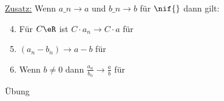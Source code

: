 \ul{Zusatz:} Wenn $a\_n→a$ und $b\_n→b$ für $\nif{}$ dann gilt:
\begin{enumerate}
\setcounter{enumi}{3}
\item{Für $C\eR$ ist $C·a_n→C·a$ für \nif }%
\item{$(a_n-b_n)→a-b$ für \nif}
\item{Wenn $b\neq 0$ dann $\frac{a_n}{b_n}→\frac{a}{b}$ für \nif}
\end{enumerate}
\bew
Übung
